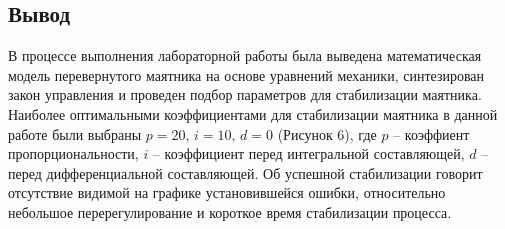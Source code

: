 \documentclass[a5paper, 10pt]{article}
\theoremstyle{definition}
\theoremstyle{plain}
\theoremstyle{remark}
\begin{document}
\subsection{Вывод}
В процессе выполнения лабораторной работы была выведена математическая модель перевернутого маятника на основе уравнений механики, синтезирован закон управления и проведен подбор параметров для стабилизации маятника. Наиболее оптимальными коэффициентами для стабилизации маятника в данной работе были выбраны  $p = 20, \, i = 10, \, d = 0$ (Рисунок 6), где $p$ -- коэффиент пропорциональности, $i$ -- коэффициент перед интегральной составляющей, $d$ -- перед дифференциальной составляющей. Об успешной стабилизации говорит отсутствие видимой на графике установившейся ошибки, относительно небольшое перерегулирование и короткое время стабилизации процесса.
\end{document}
